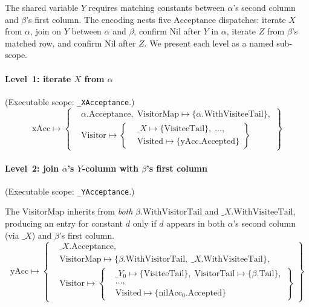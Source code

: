 The shared variable $Y$ requires matching constants
between $\alpha$'s second column and $\beta$'s first column.
The encoding nests five $\mathrm{Acceptance}$ dispatches:
iterate $X$ from $\alpha$, join on $Y$ between $\alpha$
and $\beta$, confirm $\mathrm{Nil}$ after $Y$ in $\alpha$,
iterate $Z$ from $\beta$'s matched row, and confirm
$\mathrm{Nil}$ after $Z$.
We present each level as a named sub-scope.

\paragraph{Level~1: iterate $X$ from $\alpha$}
(Executable scope: \texttt{\_XAcceptance}.)
{\small
  \[
    \mathrm{xAcc} \mapsto \left\{
      \begin{aligned}
        &\alpha.\mathrm{Acceptance},\; \mathrm{VisitorMap} \mapsto \{\alpha.\mathrm{WithVisiteeTail}\},\\
        &\mathrm{Visitor} \mapsto \left\{
          \begin{aligned}
            &\_X \mapsto \{\mathrm{VisiteeTail}\},\; \ldots,\\
            &\mathrm{Visited} \mapsto \{\mathrm{yAcc}.\mathrm{Accepted}\}
        \end{aligned}\right\}
    \end{aligned}\right\}
\]}

\paragraph{Level~2: join $\alpha$'s $Y$-column with $\beta$'s first column}

(Executable scope: \texttt{\_YAcceptance}.)

The $\mathrm{VisitorMap}$ inherits from \emph{both}
$\beta.\mathrm{WithVisitorTail}$ and
$\_X.\mathrm{WithVisiteeTail}$, producing an entry for
constant $d$ only if $d$ appears in both $\alpha$'s
second column (via $\_X$) and $\beta$'s first column.
{\small
  \[
    \mathrm{yAcc} \mapsto \left\{
      \begin{aligned}
        &\_X.\mathrm{Acceptance},\\
        &\mathrm{VisitorMap} \mapsto \{\beta.\mathrm{WithVisitorTail},\; \_X.\mathrm{WithVisiteeTail}\},\\
        &\mathrm{Visitor} \mapsto \left\{
          \begin{aligned}
            &\_Y_0 \mapsto \{\mathrm{VisiteeTail}\},\; \mathrm{VisitorTail} \mapsto \{\beta.\mathrm{Tail}\},\\
            &\ldots,\\
            &\mathrm{Visited} \mapsto \{\mathrm{nilAcc}_0.\mathrm{Accepted}\}
        \end{aligned}\right\}
    \end{aligned}\right\}
\]}

